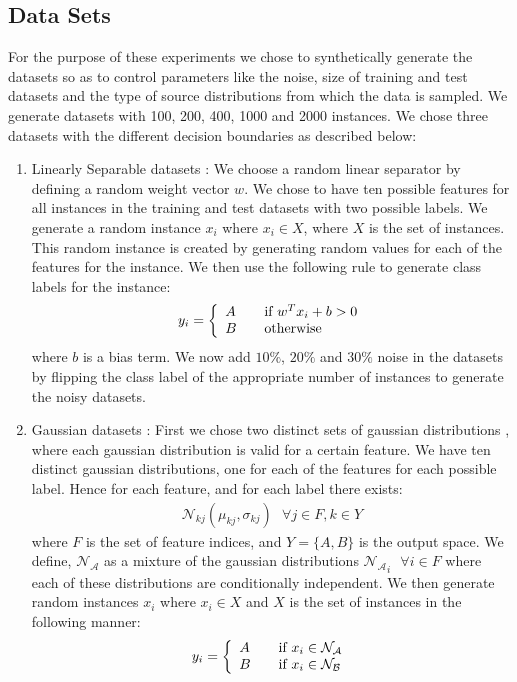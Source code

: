\documentclass[letterpaper,11pt]{article}
\begin{document}
\subsection{Data Sets}
For the purpose of these experiments we chose to synthetically generate the datasets so as to control parameters like the noise, size of training and test datasets and the type of source distributions from which the data is sampled. We generate datasets with 100, 200, 400, 1000 and 2000 instances. We chose three datasets with the different decision boundaries as described below:
\begin{enumerate} 
\item Linearly Separable datasets : We choose a random linear separator by defining a random weight vector $w$. We chose to have ten possible features for all instances in the training and test datasets with two possible labels. We generate a random instance $x_i$ where $x_i \in X$, where $X$ is the set of instances. This random instance is created by generating random values for each of the features for the instance. We then use the following rule to generate class labels for the instance:
\begin{align}
y_i = \left\{ 
  \begin{array}{l l}
    A & \quad \text{if $w^Tx_i + b > 0$}\\
    B & \quad \text{otherwise}
  \end{array} \right.
\end{align}
where $b$ is a bias term. We now add $10\%$, $20\%$ and $30\%$ noise in the datasets by flipping the class label of the appropriate number of instances to generate the noisy datasets. 
\item Gaussian datasets : First we chose two distinct sets of gaussian distributions , where each gaussian distribution is valid for a certain feature. We have ten distinct gaussian distributions, one for each of the features for each possible label. Hence for each feature, and for each label there exists:
\begin{align}
\mathcal{N}_{kj}(\mu_{kj}, \sigma_{kj}) \text{   } \forall j \in F, k \in Y
\end{align}
where $F$ is the set of feature indices, and $Y = \{ A, B\}$ is the output space. We define, $\mathcal{N_A}$ as a mixture of the gaussian distributions $\mathcal{N_A}_i \text{   }\forall i \in F$ where each of these distributions are conditionally independent. 
We then generate random instances $x_i$ where $x_i \in X$ and $X$ is the set of instances in the following manner:
\begin{align}
y_i = \left\{ 
  \begin{array}{l l}
    A & \quad \text{if $x_i \in \mathcal{N_A}$}\\
    B & \quad \text{if $x_i \in \mathcal{N_B}$}
  \end{array} \right.
\end{align}


\end{enumerate}
\end{document}
